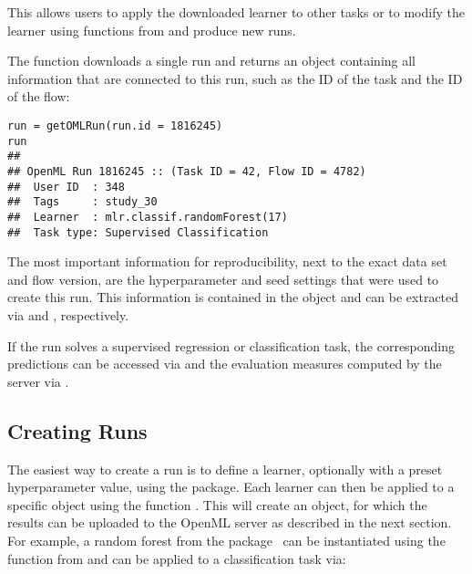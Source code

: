 This allows users to apply the downloaded learner to other tasks or to modify 
the learner using functions from  and produce new runs.

The  function downloads a single run and returns an  object
containing all information that are connected to this run, such as 
the ID of the task and the ID of the flow: %

\begin{knitrout}\small
{}\color{fgcolor}\begin{kframe}
\begin{verbatim}
run = getOMLRun(run.id = 1816245)
run
## 
## OpenML Run 1816245 :: (Task ID = 42, Flow ID = 4782)
## 	User ID  : 348
## 	Tags     : study_30
## 	Learner  : mlr.classif.randomForest(17)
## 	Task type: Supervised Classification
\end{verbatim}
\end{kframe}
\end{knitrout}

The most important information for reproducibility, next to the exact data set and flow version,
are the hyperparameter and seed settings that were used to create this run.
This information is contained in the  object and can be extracted via
 and , respectively.

If the run solves a supervised regression or classification %
task, the corresponding predictions can be accessed via  and
the evaluation measures computed by the server via . %


\subsection{Creating Runs}
\label{sec:runs}
The easiest way to create a run is to define a learner, optionally with a preset 
hyperparameter value, using the  package. Each
 learner can then be applied to a specific  object
using the function . This will create an 
object, for which the results can be uploaded to the OpenML server as described
in the next section.
For example, a random forest from the 
 package~\citep{randomForest} can be instantiated using the  
function from  and can be applied to a classification task via:

